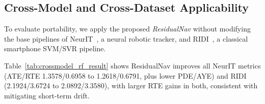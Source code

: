\documentclass[10pt,conference,letterpaper]{IEEEtran}
\begin{document}

\subsection{Cross-Model and Cross-Dataset Applicability}

To evaluate portability, we apply the proposed \textit{ResidualNav} without modifying the
base pipelines of NeurIT~\cite{neurit2024}, a neural robotic tracker,
and RIDI~\cite{ridi2018}, a classical smartphone SVM/SVR pipeline.

\begin{table}[htbp]
\caption{Residual Correction Results for NeurIT and RIDI}
\label{tab:crossmodel_rf_result}
\centering
\scriptsize
{}
\end{table}

Table~\ref{tab:crossmodel_rf_result} shows ResidualNav improves all NeurIT metrics (ATE/RTE 1.3578/0.6958 to 1.2618/0.6791, plus lower PDE/AYE) and RIDI (2.1924/3.6724 to 2.0892/3.3580), with larger RTE gains in both, consistent with mitigating short-term drift.

\begin{table}[htbp]
\caption{Inference-Time Summary for NeurIT and RIDI}
\label{tab:crossmodel_inference_time}
\centering
\scriptsize
{}
\end{table}
\end{document}

